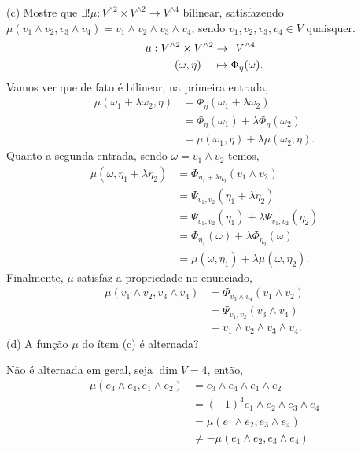 (c) Mostre que \(\exists ! \mu : V^{\wedge 2} \times V^{\wedge 2} \to V^{\wedge 4}\) bilinear, satisfazendo \(\mu(v_1 \wedge v_2, v_3 \wedge v_4) = v_1 \wedge v_2 \wedge v_3 \wedge v_4\), sendo \(v_1, v_2, v_3, v_4 \in V\) quaisquer.   
\textcolor{gris}{ 
  \-\vspace{-0cm}
  \begin{align*}
    \mu : \hspace{0cm}V^{\wedge 2} \times V^{\wedge 2} &\to\hspace{0.15cm} V^{\wedge 4}\\ 
    (\omega, \eta)\hspace{0.4cm} &\mapsto \Phi_{\eta}(\omega).
  \end{align*}
  Vamos ver que de fato é bilinear, na primeira entrada, 
  \begin{align*}
    \mu(\omega_1 + \lambda\omega_2, \eta) &= \Phi_{\eta}(\omega_1+\lambda \omega_2)\\ 
    &= \Phi_{\eta}(\omega_1) +\lambda\Phi_\eta(\omega_2)\\ 
    &= \mu(\omega_1, \eta)+ \lambda \mu(\omega_2, \eta). 
  \end{align*}
  Quanto a segunda entrada, sendo \(\omega = v_1 \wedge v_2\) temos, 
  \begin{align*}
    \mu(\omega, \eta_1 + \lambda\eta_2) &= \Phi_{\eta_1 + \lambda\eta_2}(v_1 \wedge v_2)\\ 
    &= \Psi_{v_1, v_2}(\eta_1 + \lambda \eta_2)\\ 
    &= \Psi_{v_1, v_2}(\eta_1) + \lambda \Psi_{v_1, v_2}(\eta_2)\\ 
    &= \Phi_{\eta_1}(\omega) + \lambda \Phi_{\eta_2}(\omega) \\ 
    &= \mu(\omega, \eta_1) + \lambda \mu(\omega, \eta_2). 
  \end{align*}
  Finalmente, \(\mu\) satisfaz a propriedade no enunciado,
  \begin{align*}
  \mu(v_1\wedge v_2, v_3\wedge v_4) &= \Phi_{v_3\wedge v_4}(v_1\wedge v_2) \\
  &= \Psi_{v_1,v_2} (v_3\wedge v_4)\\ 
  &= v_1 \wedge v_2 \wedge v_3 \wedge v_4.
  \end{align*} 
}
(d) A função \(\mu\) do ítem (c) é alternada? 

\textcolor{gris}{Não é alternada em geral, seja \(\dim V = 4\), então,  
\begin{align*}
  \mu(e_3 \wedge e_4, e_1\wedge e_2 ) &= e_3 \wedge e_4 \wedge e_1 \wedge e_2 \\ 
  &= (-1)^4 e_1 \wedge e_2 \wedge e_3 \wedge e_4 \\   
  &= \mu(e_1 \wedge e_2, e_3\wedge e_4)\\ 
  &\neq -\mu(e_1 \wedge e_2, e_3\wedge e_4) 
\end{align*}
}

